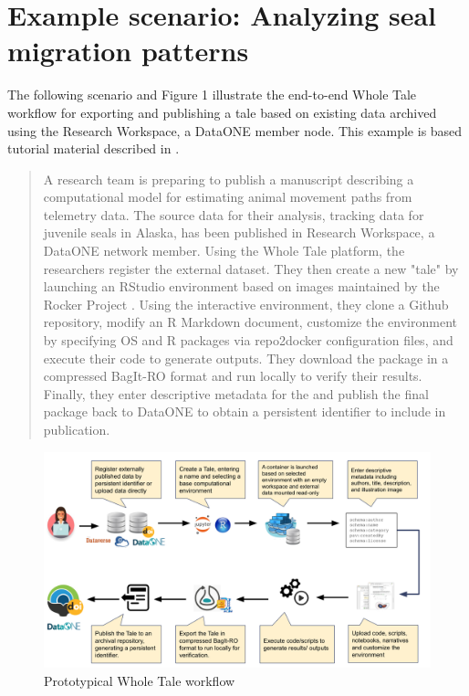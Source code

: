 \documentclass[conference]{IEEEtran}
\begin{document}
\section{Example scenario: Analyzing seal migration patterns} \label{scenario}
The following scenario and Figure 1 illustrate the end-to-end Whole Tale workflow for exporting 
and publishing a tale based on existing data archived using the Research Workspace, a DataONE 
member node. This example is based tutorial material described in \cite{london2018}.

\begin{quote}
A research team is preparing to publish a manuscript describing a computational model for 
estimating animal movement paths from telemetry data.  The source data for their analysis, 
tracking data for juvenile seals in Alaska\cite{cameron2018}, has been published in Research 
Workspace, a DataONE network member. Using the Whole Tale platform, the researchers register the 
external dataset. They then create a new "tale"  by launching an RStudio environment based on 
images maintained by the Rocker Project \cite{boettiger2018}.  Using the interactive environment, 
they clone a Github repository, modify an R Markdown document, customize the environment by 
specifying OS and R packages via repo2docker configuration files, and execute their code to 
generate outputs. They download the package in a compressed BagIt-RO format and run locally to 
verify their results. Finally, they enter descriptive metadata for the and publish the final 
package back to DataONE to obtain a persistent identifier to include in publication. 
\end{quote}


\begin{figure}
\centering
\includegraphics[scale=0.18]{images/wholetale-workflow.png}
\caption{Prototypical Whole Tale workflow}
\end{figure}
\end{document}
